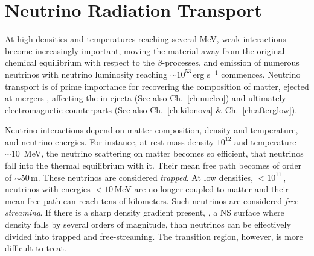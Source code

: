 
\section{Neutrino Radiation Transport}\label{sec:nr_methods:neut}



At high densities and temperatures reaching several MeV, weak interactions  become 
increasingly important, moving the material away from the original chemical equilibrium 
with respect to the $\beta$-processes, and emission of numerous neutrinos with neutrino luminosity 
reaching $\sim10^{53}\,$erg s$^{-1}$ commences. 
%
Neutrino transport is of prime importance for recovering the composition of matter, 
ejected at mergers  \citep{Wanajo:2014wha,Sekiguchi:2015dma,Foucart:2015vpa,Foucart:2015gaa},
affecting the \nuc{} in ejecta \citep{Wanajo:2014wha,Goriely:2015fqa} 
(See also Ch.~\ref{ch:nucleo})
and ultimately electromagnetic counterparts 
\citep{Metzger:2014ila,Lippuner:2015gwa} (See also Ch.~\ref{ch:kilonova} \& Ch.~\ref{ch:afterglow}).

Neutrino interactions depend on matter composition, density and temperature, 
and neutrino energies. For instance, at rest-mass density $10^{12}$\gcm{} 
and temperature $\sim10$~MeV, the neutrino scattering on matter becomes so efficient, 
that neutrinos fall into the thermal equilibrium with it. Their mean free path 
becomes of order of $\sim 50\,$m. These neutrinos are considered \textit{trapped}.
%
At low densities, $<10^{11}\,$\gcm, neutrinos with energies $<10\,$MeV 
are no longer coupled to matter and their mean free path can reach tens 
of kilometers. Such neutrinos are considered \textit{free-streaming}.
%
If there is a sharp density gradient present, \eg, a \ac{NS} surface 
where density falls by several orders of magnitude, than neutrinos can be effectively 
divided into trapped and free-streaming. The transition region, however, 
is more difficult to treat.

